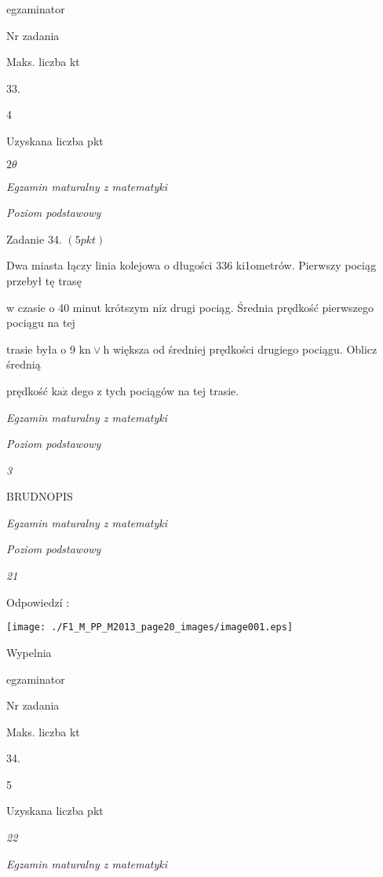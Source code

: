 \documentclass[a4paper,12pt]{article}
\begin{document}
egzaminator

Nr zadania

Maks. liczba kt

33.

4

Uzyskana liczba pkt





$ 2\theta$

{\it Egzamin maturalny z matematyki}

{\it Poziom podstawowy}

Zadanie 34. $(5pkt)$

Dwa miasta łączy linia kolejowa o długości 336 ki1ometrów. Pierwszy pociąg przebył tę trasę

w czasie o 40 minut krótszym $\mathrm{n}\mathrm{i}\dot{\mathrm{z}}$ drugi pociąg. Średnia prędkość pierwszego pociągu na tej

trasie była o 9 $\mathrm{k}\mathrm{n}\vee \mathrm{h}$ większa od średniej prędkości drugiego pociągu. Oblicz średnią

prędkość $\mathrm{k}\mathrm{a}\dot{\mathrm{z}}$ dego z tych pociągów na tej trasie.





{\it Egzamin maturalny z matematyki}

{\it Poziom podstawowy}

{\it 3}

BRUDNOPIS





{\it Egzamin maturalny z matematyki}

{\it Poziom podstawowy}

{\it 21}

Odpowiedzí :
\begin{center}
\texttt{[image: ./F1\_M\_PP\_M2013\_page20\_images/image001.eps]}
\end{center}
Wypelnia

egzaminator

Nr zadania

Maks. liczba kt

34.

5

Uzyskana liczba pkt





{\it 22}

{\it Egzamin maturalny z matematyki}
\end{document}
